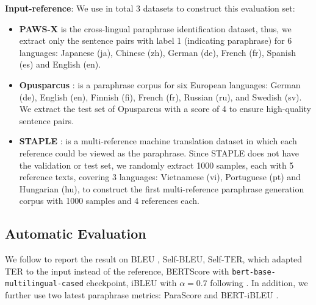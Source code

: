 \documentclass[letterpaper]{article} %
\begin{document}
\textbf{Input-reference}: We use in total 3 datasets to construct this evaluation set:
\begin{itemize}
    \item \textbf{PAWS-X} \citep{yang-etal-2019-paws} is the cross-lingual paraphrase identification dataset, thus, we extract only the sentence pairs with label 1 (indicating paraphrase) for 6 languages: Japanese (ja), Chinese (zh), German (de), French (fr), Spanish (es) and English (en).
    
    \item \textbf{Opusparcus} \citep{Creutz2019}: is a paraphrase corpus for six European languages: German (de), English (en), Finnish (fi), French (fr), Russian (ru), and Swedish (sv).  We extract the test set of Opusparcus with a score of 4 to ensure high-quality sentence pairs.
    
    \item \textbf{STAPLE} \citep{DVN/38OJR6_2020}: is a multi-reference machine translation dataset in which each reference could be viewed as the paraphrase. Since STAPLE does not have the validation or test set, we randomly extract 1000 samples, each with 5 reference texts, covering 3 languages: Vietnamese (vi), Portuguese (pt) and Hungarian (hu), to construct the first multi-reference paraphrase generation corpus with 1000 samples and 4 references each.
\end{itemize}

\subsection{Automatic Evaluation}
We follow \citet{Chowdhury_Zhuang_Wang_2022} to report the result on BLEU \citep{papineni-etal-2002-bleu}, Self-BLEU, Self-TER, which adapted TER \citep{snover-etal-2006-study} to the input instead of the reference, BERTScore \citep{zhang-etal-2020-bertscore} with \texttt{bert-base-multilingual-cased} checkpoint, iBLEU with $\alpha = 0.7$ following \citet{hosking-lapata-2021-factorising}. In addition, we further use two latest paraphrase metrics: ParaScore \citep{shen-etal-2022-evaluation} and BERT-iBLEU \citep{niu-etal-2021-unsupervised}.

\end{document}

